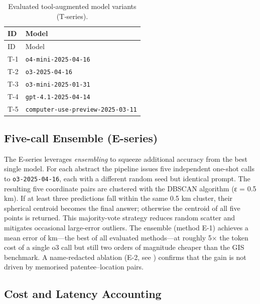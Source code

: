 \begin{longtable}[]{@{}ll@{}}
\caption{\label{tbl:tmodels}Evaluated tool‑augmented model variants
(T‑series).}\tabularnewline
\toprule\noalign{}
ID & Model \\
\midrule\noalign{}
\endfirsthead
\toprule\noalign{}
ID & Model \\
\midrule\noalign{}
\endhead
\bottomrule\noalign{}
\endlastfoot
T-1 & \passthrough{\lstinline!o4-mini-2025-04-16!} \\
T-2 & \passthrough{\lstinline!o3-2025-04-16!} \\
T-3 & \passthrough{\lstinline!o3-mini-2025-01-31!} \\
T-4 & \passthrough{\lstinline!gpt-4.1-2025-04-14!} \\
T-5 & \passthrough{\lstinline!computer-use-preview-2025-03-11!} \\
\end{longtable}

\subsection{Five-call Ensemble
(E-series)}\label{five-call-ensemble-e-series}

The E-series leverages \emph{ensembling} to squeeze additional accuracy
from the best single model. For each abstract the pipeline issues five
independent one-shot calls to \passthrough{\lstinline!o3-2025-04-16!},
each with a different random seed but identical prompt. The resulting
five coordinate pairs are clustered with the DBSCAN algorithm (ε = 0.5
km\DIFaddbegin {}\DIFaddend ). If at least three predictions fall within the same 0.5
km cluster, their spherical centroid becomes the final answer; otherwise
the centroid of all five points is returned. This majority-vote strategy
reduces random scatter and mitigates occasional large-error outliers.
The ensemble (method E-1) achieves a mean error of \DIFdelbegin {}\DIFdelend \DIFaddbegin {}\DIFaddend km---the best of
all evaluated methods---at roughly 5× the token cost of a single o3 call
but still two orders of magnitude cheaper than the GIS benchmark. A
name-redacted ablation (E-2, see \DIFdelbegin {}\DIFdelend \DIFaddbegin {}) confirms that the gain is
not driven by memorised patentee--location pairs.

\subsection{Cost and Latency
Accounting}\label{cost-and-latency-accounting}

